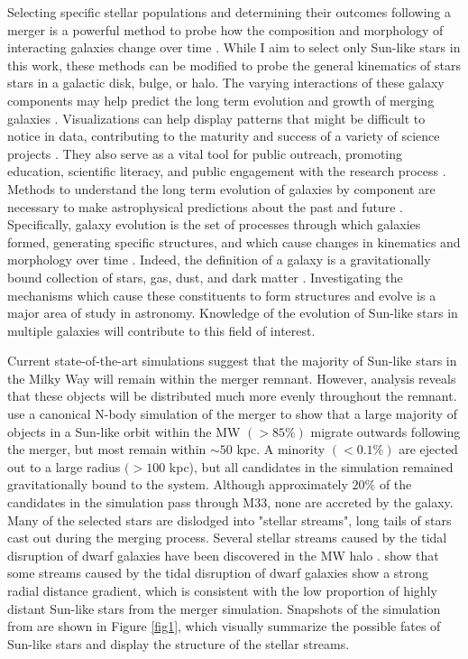\documentclass[twocolumn]{aastex631}
\begin{document}
Selecting specific stellar populations and determining their outcomes following a merger is a powerful method to probe how the composition and morphology of interacting galaxies change over time \citep{2012ApJ...753....9V}. While I aim to select only Sun-like stars in this work, these methods can be modified to probe the general kinematics of stars stars in a galactic disk, bulge, or halo. The varying interactions of these galaxy components may help predict the long term evolution and growth of merging galaxies \citep{1996ApJ...462..576D}. Visualizations can help display patterns that might be difficult to notice in data, contributing to the maturity and success of a variety of science projects \citep{2017PASP..129e8002P}. They also serve as a vital tool for public outreach, promoting education, scientific literacy, and public engagement with the research process \citep{2017PASP..129e8007R}. Methods to understand the long term evolution of galaxies by component are necessary to make astrophysical predictions about the past and future \citep{2012ApJ...753....7S}. Specifically, galaxy evolution is the set of processes through which galaxies formed, generating specific structures, and which cause changes in kinematics and morphology over time \citep{2007gitu.book.....S}. Indeed, the definition of a galaxy is a gravitationally bound collection of stars, gas, dust, and dark matter \citep{2012AJ....144...76W}. Investigating the mechanisms which cause these constituents to form structures and evolve is a major area of study in astronomy. Knowledge of the evolution of Sun-like stars in multiple galaxies will contribute to this field of interest. 

Current state-of-the-art simulations suggest that the majority of Sun-like stars in the Milky Way will remain within the merger remnant. However, analysis reveals that these objects will be distributed much more evenly throughout the remnant. \citet{2012ApJ...753....9V} use a canonical N-body simulation of the merger to show that a large majority of objects in a Sun-like orbit within the MW $(>85\%)$ migrate outwards following the merger, but most remain within $\sim 50$ kpc. A minority $(<0.1\%)$ are ejected out to a large radius $(>100$ kpc), but all candidates in the simulation remained gravitationally bound to the system. Although approximately $20\%$ of the candidates in the simulation pass through M33, none are accreted by the galaxy. Many of the selected stars are dislodged into "stellar streams", long tails of stars cast out during the merging process. Several stellar streams caused by the tidal disruption of dwarf galaxies have been discovered in the MW halo \citep[and references therein]{2006ApJ...642L.137B}. \citet{2014ApJ...787...19M} show that some streams caused by the tidal disruption of dwarf galaxies show a strong radial distance gradient, which is consistent with the low proportion of highly distant Sun-like stars from the merger simulation. Snapshots of the simulation from \citet{2012ApJ...753....9V} are shown in Figure \ref{fig1}, which visually summarize the possible fates of Sun-like stars and display the structure of the stellar streams.
\end{document}
